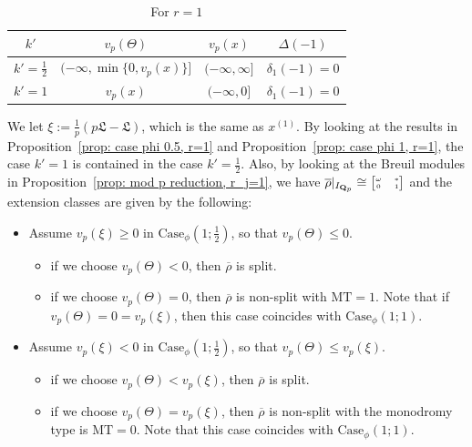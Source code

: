 \documentclass[11pt]{amsart}
\theoremstyle{definition}
\numberwithin{equation}{subsection}
\theoremstyle{plain}
\theoremstyle{plain}
\theoremstyle{plain}
\theoremstyle{plain}
\theoremstyle{plain}
\theoremstyle{plain}
\theoremstyle{plain}
\theoremstyle{plain}
\theoremstyle{plain}
\theoremstyle{plain}
\theoremstyle{plain}
\theoremstyle{plain}
\theoremstyle{definition}
\theoremstyle{definition}
\theoremstyle{definition}
\theoremstyle{remark}
\renewcommand{\(}{\textup{(}}
\renewcommand{\)}{\textup{)}}
\newcommand{\Qp}{\mathbf{Q}_p}
\newcommand{\rhobar}{\overline{\rho}}
\newcommand{\fL}{\mathfrak{L}}
\begin{document}
\begin{small}
\begin{table}[htbp]
  \centering
  \begin{tabular}{|c||c|c|c|}
  \hline
    $k'$ & $v_p(\Theta)$ & $v_p(x)$ & $\Delta(-1)$ \\ \hline\hline
    $k'=\frac{1}{2}$ & $(-\infty,\min\{0,v_p(x)\}]$ & $(-\infty,\infty]$ & $\delta_1(-1)=0$ \\\hline
    $k'=1$ & $v_p(x)$ & $(-\infty,0]$ & $\delta_1(-1)=0$ \\\hline
  \end{tabular}
  \caption{For $r=1$}    \label{tab: r=1}
\end{table}
\end{small}
We let $\xi:=\frac{1}{p}(p\fL-\fL)$, which is the same as $x^{(1)}$. By looking at the results in Proposition~\ref{prop: case phi 0.5, r=1} and Proposition~\ref{prop: case phi 1, r=1}, the case $k'=1$ is contained in the case $k'=\frac{1}{2}$. Also, by looking at the Breuil modules in Proposition~\ref{prop: mod p reduction, r_j=1}, we have
$\rhobar|_{I_{\Qp}}\cong
\begin{tiny}
\begin{bmatrix}
    \omega & * \\ 0 & 1
\end{bmatrix}
\end{tiny}$ 
and the extension classes are given by the following:
\begin{itemize}[leftmargin=*]
\item Assume $v_p(\xi)\geq 0$ in $\mbox{Case}_\phi(1;\frac{1}{2})$, so that $v_p(\Theta)\leq 0$.
\begin{itemize}[leftmargin=*]
    \item if we choose $v_p(\Theta)<0$, then $\rhobar$ is split.
    \item if we choose $v_p(\Theta)=0$, then $\rhobar$ is non-split with $\mathrm{MT}=1$. Note that if $v_p(\Theta)=0=v_p(\xi)$, then this case coincides with $\mbox{Case}_\phi(1;1)$.
\end{itemize}
\item Assume $v_p(\xi)<0$ in $\mbox{Case}_\phi(1;\frac{1}{2})$, so that $v_p(\Theta)\leq v_p(\xi)$.
\begin{itemize}[leftmargin=*]
    \item if we choose $v_p(\Theta)<v_p(\xi)$, then $\rhobar$ is split.
    \item if we choose $v_p(\Theta)=v_p(\xi)$, then $\rhobar$ is non-split with the monodromy type is $\mathrm{MT}=0$. Note that this case coincides with $\mbox{Case}_\phi(1;1)$.
\end{itemize}
\end{itemize}
\end{document}

